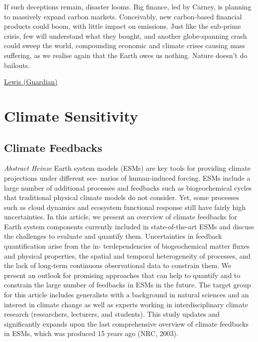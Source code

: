 \documentclass[
]{book}
\begin{document}
If such deceptions remain, disaster looms. Big finance, led by Carney, is planning to massively expand carbon markets. Conceivably, new carbon-based financial products could boom, with little impact on emissions. Just like the sub-prime crisis, few will understand what they bought, and another globe-spanning crash could sweep the world, compounding economic and climate crises causing mass suffering, as we realise again that the Earth owes us nothing. Nature doesn't do bailouts.

\href{https://www.theguardian.com/commentisfree/2021/mar/03/climate-crisis-carbon-accounting-tricks-big-finance}{Lewis (Guardian)}

\hypertarget{climate-sensitivity}{%
\chapter{Climate Sensitivity}\label{climate-sensitivity}}

\hypertarget{climate-feedbacks}{%
\section{Climate Feedbacks}\label{climate-feedbacks}}

\emph{Abstract Heinze}
Earth system models (ESMs) are key tools for providing climate projections under different sce-
narios of human-induced forcing. ESMs include a large number of additional processes and feedbacks such as
biogeochemical cycles that traditional physical climate models do not consider. Yet, some processes such as
cloud dynamics and ecosystem functional response still have fairly high uncertainties. In this article, we present
an overview of climate feedbacks for Earth system components currently included in state-of-the-art ESMs and
discuss the challenges to evaluate and quantify them. Uncertainties in feedback quantification arise from the in-
terdependencies of biogeochemical matter fluxes and physical properties, the spatial and temporal heterogeneity
of processes, and the lack of long-term continuous observational data to constrain them. We present an outlook
for promising approaches that can help to quantify and to constrain the large number of feedbacks in ESMs in
the future. The target group for this article includes generalists with a background in natural sciences and an
interest in climate change as well as experts working in interdisciplinary climate research (researchers, lecturers,
and students). This study updates and significantly expands upon the last comprehensive overview of climate
feedbacks in ESMs, which was produced 15 years ago (NRC, 2003).
\end{document}
